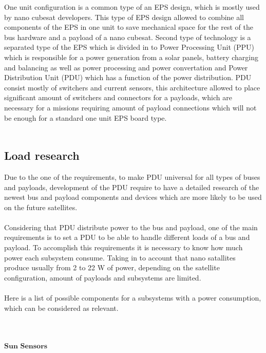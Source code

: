 One unit configuration is a common type of an EPS design, which is mostly used by nano cubesat developers. This type of EPS design allowed to combine all components of the EPS in one unit to save mechanical space for the rest of the bus hardware and a payload of a nano cubesat. Second type of technology is a separated type of the EPS which is divided in to Power Processing Unit (PPU) which is responsible for a power generation from a solar panels, battery charging and balancing as well as power processing and power convertation and Power Distribution Unit (PDU) which has a function of the power distribution. PDU consist mostly of switchers and current sensors, this architecture allowed to place significant amount of switchers and connectors for a payloads, which are necessary for a missions requiring amount of payload connections which will not be enough for a standard one unit EPS board type. \\
\\


\subsection{Load research\label{sec:aaa}}

Due to the one of the requirements, to make PDU universal for all types of buses and payloads, development of the PDU require to have a detailed research of the newest bus and payload components and devices which are more likely to be used on the future satellites.\\
\\
 Considering that PDU distribute power to the bus and payload, one of the main requirements is to set a PDU to be able to handle different loads of a bus and payload. To accomplish this requirements it is necessary to know how much power each subsystem consume. Taking in to account that nano satallites produce usually from 2 to 22 W of power, depending on the satellite configuration, amount of payloads and subsystems are limited. \\
 \\
 Here is a list of possible components for a subsystems with a power consumption, which can be considered as relevant. \\ \\ \\ \\
 
 $\textbf{Sun Sensors}$\\

